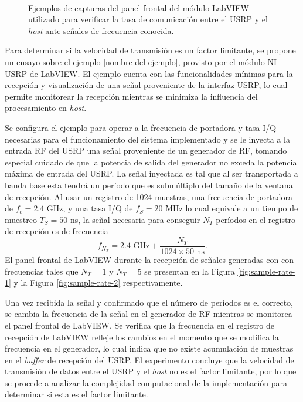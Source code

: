 \begin{figure}[t]
    \centering
    \\
    \caption{Ejemplos de capturas del panel frontal del módulo LabVIEW utilizado para verificar la tasa de comunicación entre el USRP y el \textit{host} ante señales de frecuencia conocida.\label{fig:sample-rate-lv}}
\end{figure}

Para determinar si la velocidad de transmisión es un factor limitante, se propone un ensayo sobre el ejemplo [nombre del ejemplo], provisto por el módulo NI-USRP de LabVIEW. El ejemplo cuenta con las funcionalidades mínimas para la recepción y visualización de una señal proveniente de la interfaz USRP, lo cual permite monitorear la recepción mientras se minimiza la influencia del procesamiento en \textit{host}. 

Se configura el ejemplo para operar a la frecuencia de portadora y tasa I/Q necesarias para el funcionamiento del sistema implementado y se le inyecta a la entrada RF del USRP una señal proveniente de un generador de RF, tomando especial cuidado de que la potencia de salida del generador no exceda la potencia máxima de entrada del USRP. La señal inyectada es tal que al ser transportada a banda base esta tendrá un período que es submúltiplo del tamaño de la ventana de recepción. Al usar un registro de 1024 muestras, una frecuencia de portadora de $f_c = 2.4$ GHz, y una tasa I/Q de $f_S = 20$ MHz lo cual equivale a un tiempo de muestreo $T_S = 50$ ns, la señal necesaria para conseguir $N_T$ períodos en el registro de recepción es de frecuencia
\begin{equation}
    f_{N_T} = 2.4\text{ GHz} + \frac{N_T}{1024 \times 50\text{ ns}}.
\end{equation}
El panel frontal de LabVIEW durante la recepción de señales generadas con  con frecuencias tales que $N_T = 1$ y $N_T=5$ se presentan en la Figura \ref{fig:sample-rate-1} y la Figura \ref{fig:sample-rate-2} respectivamente.  

Una vez recibida la señal y confirmado que el número de períodos es el correcto, se cambia la frecuencia de la señal en el generador de RF mientras se monitorea el panel frontal de LabVIEW. Se verifica que la frecuencia en el registro de recepción de LabVIEW refleje los cambios en el momento que se modifica la frecuencia en el generador, lo cual indica que no existe acumulación de muestras en el \textit{buffer} de recepción del USRP. El experimento concluye que la velocidad de transmisión de datos entre el USRP y el \textit{host} no es el factor limitante, por lo que se procede a analizar la complejidad computacional de la implementación para determinar si esta es el factor limitante.



